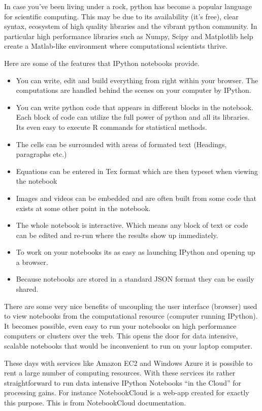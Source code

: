\documentclass[11pt, a4paper]{article}  %
\begin{document}
\begin{multicols}{2}
In case you've been living under a rock, python has become a popular language
for scientific computing. This may be due to its availability (it's free),
clear syntax, ecosystem of high quality libraries and the vibrant python
community. In particular high performance libraries such as Numpy, Scipy and
Matplotlib \cite{py} help create a Matlab-like environment where computational
scientists thrive.

Here are some of the features that IPython notebooks provide.

\begin{itemize}
\item You can write, edit and build everything from right within your browser.
The computations are handled behind the scenes on your computer by
IPython.
\item You can write python code that appears in different blocks in the
notebook. Each block of code can utilize the full power of python and all its
libraries. Its even easy to execute R commands for statistical methods.
\item The cells can be surrounded with areas of formated text (Headings,
paragraphs etc.)
\item Equations can be entered in Tex format which are then typeset when
viewing the notebook
\item Images and videos can be embedded and are often built from some code that
exists at some other point in the notebook.
\item The whole notebook is interactive. Which means any block of text or code
can be edited and re-run where the results show up immediately.
\item To work on your notebooks its as easy as launching IPython and opening
up a browser.
\item Because notebooks are stored in a standard JSON format they can be
easily shared.
\end{itemize}

There are some very nice benefits of uncoupling the user interface (browser)
used to view notebooks from the computational resource (computer running
IPython). It becomes possible, even easy to run your notebooks on high
performance computers or clusters over the web. This opens the door for data
intensive, scalable notebooks that would be inconvenient to run on your laptop
computer. 

These days with services like Amazon EC2 \cite{ec2} and Windows Azure
\cite{azure} it is possible to rent a large number of computing resources.
With these services its rather straightforward to run data intensive IPython
Notebooks ``in the Cloud'' for processing gains. For instance NotebookCloud is
a web-app created for exactly this purpose. This is from NotebookCloud
documentation.


\end{multicols}
\end{document}
